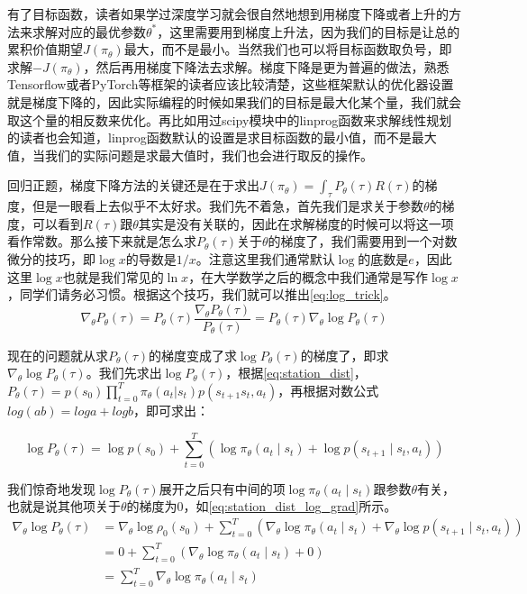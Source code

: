 有了目标函数，读者如果学过深度学习就会很自然地想到用梯度下降或者上升的方法来求解对应的最优参数$\theta^{*}$，这里需要用到梯度上升法，因为我们的目标是让总的累积价值期望$J(\pi_{\theta})$最大，而不是最小。当然我们也可以将目标函数取负号，即求解$-J(\pi_{\theta})$，然后再用梯度下降法去求解。梯度下降是更为普遍的做法，熟悉Tensorflow或者PyTorch等框架的读者应该比较清楚，这些框架默认的优化器设置就是梯度下降的，因此实际编程的时候如果我们的目标是最大化某个量，我们就会取这个量的相反数来优化。再比如用过scipy模块中的linprog函数来求解线性规划的读者也会知道，linprog函数默认的设置是求目标函数的最小值，而不是最大值，当我们的实际问题是求最大值时，我们也会进行取反的操作。

回归正题，梯度下降方法的关键还是在于求出$J(\pi_{\theta})=\int_\tau P_{\theta}(\tau) R(\tau)$的梯度，但是一眼看上去似乎不太好求。我们先不着急，首先我们是求关于参数$\theta$的梯度，可以看到$R(\tau)$跟$\theta$其实是没有关联的，因此在求解梯度的时候可以将这一项看作常数。那么接下来就是怎么求$P_{\theta}(\tau)$关于$\theta$的梯度了，我们需要用到一个对数微分的技巧，即$\log x$的导数是$1/x$。注意这里我们通常默认$\log$的底数是$e$，因此这里$\log x$也就是我们常见的$\ln x$，在大学数学之后的概念中我们通常是写作$\log x$，同学们请务必习惯。根据这个技巧，我们就可以推出\eqref{eq:log_trick}。
\begin{equation}
    \label{eq:log_trick}
    \nabla_\theta P_{\theta}(\tau)= P_{\theta}(\tau) \frac{\nabla_\theta P_{\theta}(\tau)}{P_{\theta}(\tau) }= P_{\theta}(\tau) \nabla_\theta \log P_{\theta}(\tau)
\end{equation}

现在的问题就从求$P_{\theta}(\tau)$的梯度变成了求$\log P_{\theta}(\tau)$的梯度了，即求$\nabla_\theta \log P_{\theta}(\tau)$。我们先求出$\log P_{\theta}(\tau)$，根据\eqref{eq:station_dist}，$P_{\theta}(\tau)=p(s_{0}) \prod_{t=0}^{T} \pi_{\theta}\left(a_{t} | s_{t}\right) p\left(s_{t+1}  s_{t}, a_{t}\right)$，再根据对数公式$log (ab) = log a + log b$，即可求出：

\begin{equation}
    \label{eq:station_dist_log}
    \log P_{\theta}(\tau)= \log p(s_{0})  +  \sum_{t=0}^T(\log \pi_{\theta}(a_t \mid s_t)+\log p(s_{t+1} \mid s_t,a_t))
\end{equation}

我们惊奇地发现$\log P_{\theta}(\tau)$展开之后只有中间的项$\log \pi_{\theta}(a_t \mid s_t)$跟参数$\theta$有关，也就是说其他项关于$\theta$的梯度为0，如\eqref{eq:station_dist_log_grad}所示。
\begin{equation}
    \label{eq:station_dist_log_grad}
    \begin{aligned}
    \nabla_\theta \log P_{\theta}(\tau) &=\nabla_\theta \log \rho_0\left(s_0\right)+\sum_{t=0}^T\left(\nabla_\theta \log \pi_\theta\left(a_t \mid s_t\right)+\nabla_\theta \log p\left(s_{t+1} \mid s_t, a_t\right)\right) \\
    &=0+\sum_{t=0}^T\left(\nabla_\theta \log \pi_\theta\left(a_t \mid s_t\right)+0\right) \\
    &=\sum_{t=0}^T \nabla_\theta \log \pi_\theta\left(a_t \mid s_t\right)
    \end{aligned}
\end{equation}

